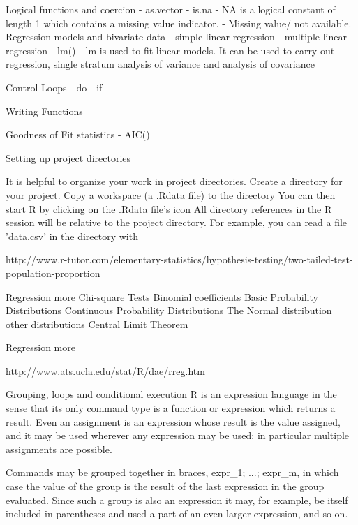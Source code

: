 \documentclass[a4paper,12pt]{article}
\begin{document}
Logical functions and coercion
 - as.vector
 - is.na
 - NA is a logical constant of length 1 which contains a missing value indicator.
 - Missing value/ not available. 
Regression models and bivariate data
 - simple linear regression 
 - multiple linear regression 
 - lm()
 - lm is used to fit linear models. It can be used to carry out regression, single stratum analysis of variance and analysis of covariance 

Control Loops
 - do 
 - if 

Writing Functions

Goodness of Fit statistics
 - AIC()




Setting up project directories

It is helpful to organize your work in project directories.
Create a directory for your project.
Copy a workspace (a .Rdata file) to the directory
You can then start R by clicking on the .Rdata file's icon
All directory references in the R session will be relative to the project directory. For example, you can read a file 'data.csv' in the directory with


 
http://www.r-tutor.com/elementary-statistics/hypothesis-testing/two-tailed-test-population-proportion
 

Regression more
Chi-square Tests
Binomial coefficients
Basic Probability Distributions
Continuous Probability Distributions
The Normal distribution
other distributions
Central Limit Theorem

Regression more

http://www.ats.ucla.edu/stat/R/dae/rreg.htm

Grouping, loops and conditional execution
R is an expression language in the sense that its only command type is a function or expression which returns a result. Even an assignment is an expression whose result is the value assigned, and it may be used wherever any expression may be used; in particular multiple assignments are possible.

Commands may be grouped together in braces, {expr_1; ...; expr_m}, in which case the value of the group is the result of the last expression in the group evaluated. Since such a group is also an expression it may, for example, be itself included in parentheses and used a part of an even larger expression, and so on.  
\end{document}
